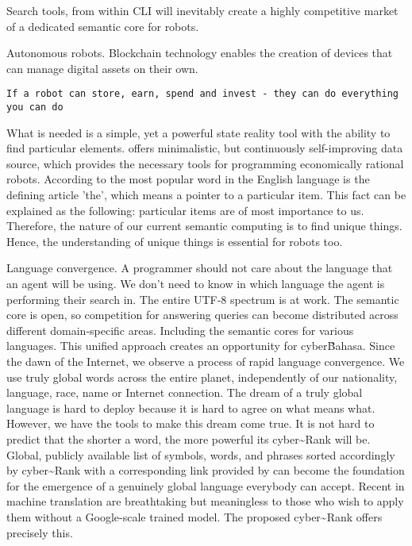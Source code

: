 \documentclass[8pt,oneside]{amsart}
\newcommand{\linkred}[2]{\href{#1}{\color{red}{#2}}}
\newcommand{\linkgreen}[2]{\href{#1}{\color{green}{#2}}}
\begin{document}
Search tools, from within CLI will inevitably create a highly competitive market of a dedicated semantic core for robots.

Autonomous robots. Blockchain technology enables the creation of devices that can manage digital assets on their own.

\begin{lstlisting}
If a robot can store, earn, spend and invest - they can do everything you can do
\end{lstlisting}

What is needed is a simple, yet a powerful state reality tool with the ability to find particular elements. \linkred{https://github.com/cybercongress/go-cyber}{go-cyber} offers minimalistic, but continuously self-improving data source, which provides the necessary tools for programming economically rational robots. According to \linkred{https://github.com/first20hours/google-10000-english}{top-10,000 English words} the most popular word in the English language is the defining article 'the', which means a pointer to a particular item. This fact can be explained as the following: particular items are of most importance to us. Therefore, the nature of our current semantic computing is to find unique things. Hence, the understanding of unique things is essential for robots too.

Language convergence. A programmer should not care about the language that an agent will be using. We don't need to know in which language the agent is performing their search in. The entire UTF-8 spectrum is at work. The semantic core is open, so competition for answering queries can become distributed across different domain-specific areas. Including the semantic cores for various languages. This unified approach creates an opportunity for cyber\~Bahasa. Since the dawn of the Internet, we observe a process of rapid language convergence. We use truly global words across the entire planet, independently of our nationality, language, race, name or Internet connection. The dream of a truly global language is hard to deploy because it is hard to agree on what means what. However, we have the tools to make this dream come true. It is not hard to predict that the shorter a word, the more powerful its cyber\~{}Rank will be. Global, publicly available list of symbols, words, and phrases sorted accordingly by cyber\~{}Rank with a corresponding link provided by \linkred{https://github.com/cybercongress/go-cyber}{go-cyber} can become the foundation for the emergence of a genuinely global language everybody can accept. Recent \linkgreen{https://ipfs.io/ipfs/QmPq1zjdDix2jA1D1Z2wJsuWdzoKPMuKqPtPZrC8VGtC7Q}{scientific advances} in machine translation are breathtaking but meaningless to those who wish to apply them without a Google-scale trained model. The proposed cyber\~{}Rank offers precisely this.
\end{document}
